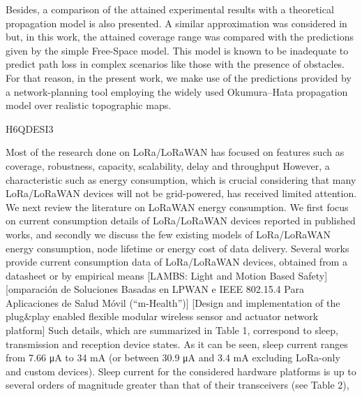 Besides,
	a comparison of the attained experimental results with a theoretical propagation model is also presented.
A similar approximation was considered in \cite{petajajarvi_coverage_2015} but,
	in this work,
	the attained coverage range was compared with the predictions given by the simple Free-Space model.
This model is known to be inadequate to predict path loss in complex scenarios like those with the presence of obstacles.
For that reason,
	in the present work,
	we make use of the predictions provided by a network-planning tool employing the widely used Okumura–Hata propagation model over realistic topographic maps.

\cite{casals_modeling_2017} H6QDESI3

Most of the research done on LoRa/LoRaWAN has focused on features such as coverage,
	robustness,
	capacity,
	scalability,
	delay and throughput \cite{mikhaylov_analysis_2016}
 \cite{petajajarvi_coverage_2015}
\cite{adelantado_understanding_2017}
\cite{augustin_study_2016}
\cite{nolan_evaluation_2016}
\cite{petajajarvi_performance_2017}
\cite{mikhaylov_lorawan_2017}
\cite{jetmir_haxhibeqiri_lora_2017}
\cite{petajajarvi_evaluation_2017}
However,
	a characteristic such as energy consumption,
	which is crucial considering that many LoRa/LoRaWAN devices will not be grid-powered,
	has received limited attention.
We next review the literature on LoRaWAN energy consumption.
We first focus on current consumption details of LoRa/LoRaWAN devices reported in published works,
	and secondly we discuss the few existing models of LoRa/LoRaWAN energy consumption,
	node lifetime or energy cost of data delivery.
Several works provide current consumption data of LoRa/LoRaWAN devices,
	obtained from a datasheet or by empirical means  \cite{petajajarvi_evaluation_2017}
\cite{kim_cooperative_2017}
\cite{mahmoud_study_2016}
[LAMBS: Light and Motion Based Safety] \cite{bor_lora_2017}
[omparación de Soluciones Basadas en LPWAN e IEEE 802.15.4 Para Aplicaciones de Salud Móvil (“m-Health”)] \cite{neumann_indoor_2016}
[Design and implementation of the plug\&play enabled ﬂexible modular wireless sensor and actuator network platform] \cite{magno_wulora_2017}
\cite{dongare_openchirp_2017}
\cite{conus_event-driven_2016}
Such details,
	which are summarized in Table 1,
	correspond to sleep,
	transmission and reception device states.
As it can be seen,
	sleep current ranges from 7.66 μA to 34 mA (or between 30.9 μA and 3.4 mA excluding LoRa-only and custom devices).
Sleep current for the considered hardware platforms is up to several orders of magnitude greater than that of their transceivers (see Table 2),
